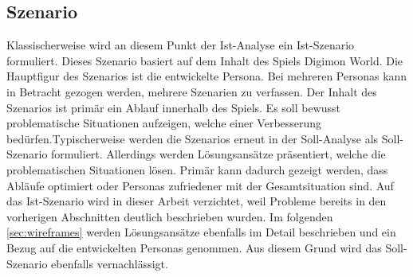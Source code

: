 \subsection{Szenario}
Klassischerweise wird an diesem Punkt der Ist-Analyse ein Ist-Szenario formuliert\cite[S. 419]{grundlagen-grochla}. Dieses Szenario basiert auf dem Inhalt des Spiels Digimon World. Die Hauptfigur des Szenarios ist die entwickelte Persona. Bei mehreren Personas kann in Betracht gezogen werden, mehrere Szenarien zu verfassen. Der Inhalt des Szenarios ist primär ein Ablauf innerhalb des Spiels. Es soll bewusst problematische Situationen aufzeigen, welche einer Verbesserung bedürfen.Typischerweise werden die Szenarios erneut in der Soll-Analyse als Soll-Szenario formuliert. Allerdings werden Lösungsansätze präsentiert, welche die problematischen Situationen lösen. Primär kann dadurch gezeigt werden, dass Abläufe optimiert oder Personas zufriedener mit der Gesamtsituation sind. Auf das Ist-Szenario wird in dieser Arbeit verzichtet, weil Probleme bereits in den vorherigen Abschnitten deutlich beschrieben wurden. Im folgenden \autoref{sec:wireframes} werden Lösungsansätze ebenfalls im Detail beschrieben und ein Bezug auf die entwickelten Personas genommen. Aus diesem Grund wird das Soll-Szenario ebenfalls vernachlässigt.